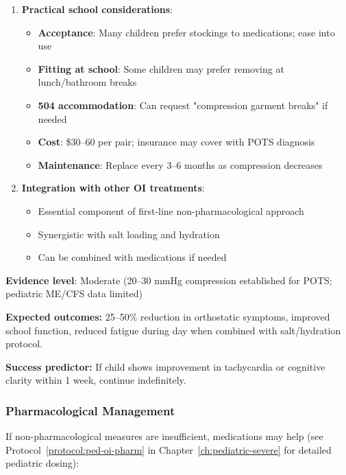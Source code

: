 \begin{recommendation}
\begin{enumerate}
    \item \textbf{Practical school considerations}:
    \begin{itemize}
        \item \textbf{Acceptance}: Many children prefer stockings to medications; ease into use
        \item \textbf{Fitting at school}: Some children may prefer removing at lunch/bathroom breaks
        \item \textbf{504 accommodation}: Can request "compression garment breaks" if needed
        \item \textbf{Cost}: \$30--60 per pair; insurance may cover with POTS diagnosis
        \item \textbf{Maintenance}: Replace every 3--6 months as compression decreases
    \end{itemize}

    \item \textbf{Integration with other OI treatments}:
    \begin{itemize}
        \item Essential component of first-line non-pharmacological approach
        \item Synergistic with salt loading and hydration
        \item Can be combined with medications if needed
    \end{itemize}
\end{enumerate}

\textbf{Evidence level}: Moderate (20--30 mmHg compression established for POTS; pediatric ME/CFS data limited)

\textbf{Expected outcomes:} 25--50\% reduction in orthostatic symptoms, improved school function, reduced fatigue during day when combined with salt/hydration protocol.

\textbf{Success predictor:} If child shows improvement in tachycardia or cognitive clarity within 1 week, continue indefinitely.

\end{recommendation}

\subsubsection{Pharmacological Management}

If non-pharmacological measures are insufficient, medications may help (see Protocol~\ref{protocol:ped-oi-pharm} in Chapter~\ref{ch:pediatric-severe} for detailed pediatric dosing):

